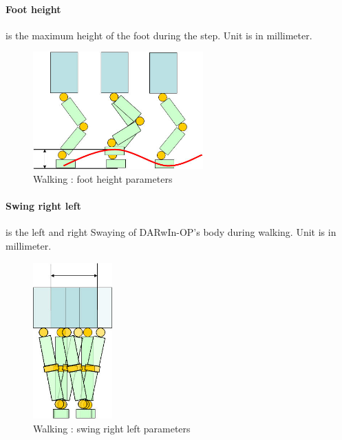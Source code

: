 \documentclass[a4paper, 12pt]{article}  		%
\begin{document}
\paragraph*{Foot height}
is the maximum height of the foot during the step. Unit is in millimeter.
\begin{figure}[H]
\begin{center}
\includegraphics[height=4.5cm]{foot_height.jpg}
\caption{Walking : foot height parameters}
\label{foot_height}
\end{center}
\end{figure}

\paragraph*{Swing right left}
is the left and right Swaying of DARwIn-OP's body during walking. Unit is in millimeter.
\begin{figure}[H]
\begin{center}
\includegraphics[height=6cm]{swing_right_left.jpg}
\caption{Walking : swing right left parameters}
\label{swing_right_left}
\end{center}
\end{figure}
\end{document}
